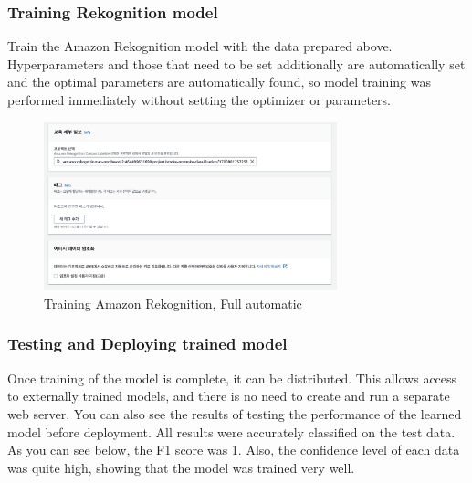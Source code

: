 \subsubsection{\textbf{Training Rekognition model}}
Train the Amazon Rekognition model with the data prepared above. Hyperparameters and those that need to be set additionally are automatically set and the optimal parameters are automatically found, so model training was performed immediately without setting the optimizer or parameters.


\begin{figure}[h]
    \centering
    \includegraphics[width=8.5cm]{images/rek_training.png}
    \caption{Training Amazon Rekognition, Full automatic}
\end{figure}

\subsubsection{\textbf{Testing and Deploying trained model}}
Once training of the model is complete, it can be distributed. This allows access to externally trained models, and there is no need to create and run a separate web server. You can also see the results of testing the performance of the learned model before deployment. All results were accurately classified on the test data. As you can see below, the F1 score was 1. Also, the confidence level of each data was quite high, showing that the model was trained very well.



